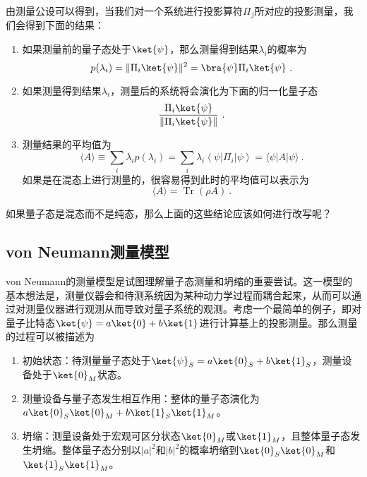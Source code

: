 由测量公设可以得到，当我们对一个系统进行投影算符$\Pi_j$所对应的投影测量，我们会得到下面的结果：
\begin{enumerate}
\item 如果测量前的量子态处于$\ket{\psi}$，那么测量得到结果$\lambda_i$的概率为\begin{equation}
p(\lambda_i)=\Vert \Pi_i\ket{\psi}\Vert^2=\bra{\psi}\Pi_i\ket{\psi}~.
\end{equation}
\item 如果测量得到结果$\lambda_i$，测量后的系统将会演化为下面的归一化量子态
\begin{equation}
\frac{\Pi_i\ket{\psi}}{\Vert\Pi_i\ket{\psi}\Vert}~.
\end{equation}
\item 测量结果的平均值为\begin{equation}
\langle A\rangle \equiv \sum_i \lambda_i p\left(\lambda_i\right)=\sum_i \lambda_i\left\langle\psi\left|\Pi_i\right| \psi\right\rangle=\langle\psi|A| \psi\rangle~.
\end{equation}
如果是在混态上进行测量的，很容易得到此时的平均值可以表示为
\begin{equation}
\langle A\rangle=\operatorname{Tr}(\rho A)~.
\end{equation}

\end{enumerate}

\begin{exercise}{}
如果量子态是混态而不是纯态，那么上面的这些结论应该如何进行改写呢？
\end{exercise}

\subsection{von Neumann测量模型}

von Neumann的测量模型是试图理解量子态测量和坍缩的重要尝试。这一模型的基本想法是，测量仪器会和待测系统因为某种动力学过程而耦合起来，从而可以通过对测量仪器进行观测从而导致对量子系统的观测。考虑一个最简单的例子，即对量子比特态$\ket{\psi}=a\ket{0}+b\ket{1}$进行计算基上的投影测量。那么测量的过程可以被描述为
\begin{enumerate}
\item 初始状态：待测量量子态处于$\ket{\psi}_S=a\ket{0}_S+b\ket{1}_S$，测量设备处于$\ket{0}_M$状态。
\item 测量设备与量子态发生相互作用：整体的量子态演化为$a\ket{0}_S\ket{0}_M+b\ket{1}_S\ket{1}_M$。
\item 坍缩：测量设备处于宏观可区分状态$\ket{0}_M$或$\ket{1}_M$，且整体量子态发生坍缩。整体量子态分别以$|a|^2$和$|b|^2$的概率坍缩到$\ket{0}_S\ket{0}_M$和$\ket{1}_S\ket{1}_M$。
\end{enumerate}


